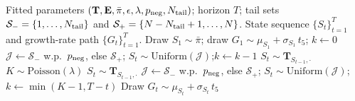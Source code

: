 \begin{algorithm}[t]
\caption{Hidden Markov model with jumps (HMM-WJ) single-asset marginal generator.}
\label{alg:hmmwj}
\begin{algorithmic}[1]
  \REQUIRE Fitted parameters
    $(\mathbf{T}, \mathbf{E}, \bar{\pi}, \epsilon, \lambda,
    p_{\rm neg}, N_{\rm tail})$; horizon $T$;
    tail sets $\mathcal{S}_{-} = \{1, \dots, N_{\rm tail}\}$ and
    $\mathcal{S}_{+} = \{N - N_{\rm tail} + 1, \dots, N\}$.
  \ENSURE State sequence $\{S_t\}_{t=1}^{T}$ and growth-rate path
    $\{G_t\}_{t=1}^{T}$.
  \STATE Draw $S_1 \sim \bar{\pi}$;\quad
    draw $G_1 \sim \mu_{S_1} + \sigma_{S_1}\, t_{5}$;\quad
    $k \gets 0$
    \hfill {}
      \STATE $\mathcal{J} \gets \mathcal{S}_{-}$ w.p.\ $p_{\rm neg}$, else $\mathcal{S}_{+}$;\quad
        $S_t \sim \mathrm{Uniform}(\mathcal{J})$;\quad $k \gets k - 1$
        \hfill {}
      \STATE $S_t \sim \mathbf{T}_{S_{t-1}, \cdot}$
        \hfill {}
    \ELSE
      \STATE $K \sim \mathrm{Poisson}(\lambda)$
        \hfill {}
        \STATE $S_t \sim \mathbf{T}_{S_{t-1}, \cdot}$
          \hfill {}
      \ELSE
        \STATE $\mathcal{J} \gets \mathcal{S}_{-}$ w.p.\ $p_{\rm neg}$, else $\mathcal{S}_{+}$;\quad
          $S_t \sim \mathrm{Uniform}(\mathcal{J})$;\quad
          $k \gets \min(K - 1, T - t)$
          \hfill {}
      \ENDIF
    \ENDIF
    \STATE Draw $G_t \sim \mu_{S_t} + \sigma_{S_t}\, t_{5}$
      \hfill {}
  \ENDFOR
\end{algorithmic}
\end{algorithm}


